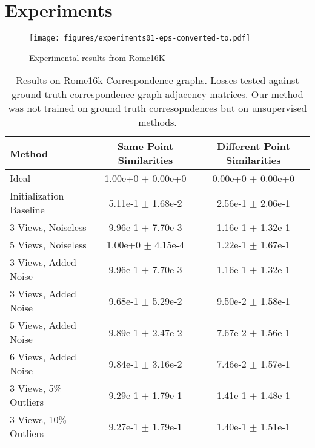 \documentclass[10pt,twocolumn,letterpaper]{article}
\begin{document}
\section{Experiments}

\begin{figure*}
\begin{center}
  \texttt{[image: figures/experiments01-eps-converted-to.pdf]}
  \end{center}
     \caption{Experimental results from Rome16K}
  \label{fig:short}
\end{figure*}

\begin{table*}
\begin{center}
\begin{tabular}{|l|c|c|}
\hline
Method & Same Point Similarities & Different Point Similarities  \\
\hline\hline\hline
Ideal                              & 1.00e+0 $\pm$ 0.00e+0 & 0.00e+0 $\pm$ 0.00e+0 \\ \hline
Initialization Baseline            & 5.11e-1 $\pm$ 1.68e-2 & 2.56e-1 $\pm$ 2.06e-1 \\ \hline
3 Views, Noiseless                 & 9.96e-1 $\pm$ 7.70e-3 & 1.16e-1 $\pm$ 1.32e-1 \\ \hline
5 Views, Noiseless                 & 1.00e+0 $\pm$ 4.15e-4 & 1.22e-1 $\pm$ 1.67e-1 \\ \hline
3 Views, Added Noise               & 9.96e-1 $\pm$ 7.70e-3 & 1.16e-1 $\pm$ 1.32e-1 \\ \hline
3 Views, Added Noise               & 9.68e-1 $\pm$ 5.29e-2 & 9.50e-2 $\pm$ 1.58e-1 \\ \hline
5 Views, Added Noise               & 9.89e-1 $\pm$ 2.47e-2 & 7.67e-2 $\pm$ 1.56e-1 \\ \hline
6 Views, Added Noise               & 9.84e-1 $\pm$ 3.16e-2 & 7.46e-2 $\pm$ 1.57e-1 \\ \hline
3 Views, 5\% Outliers              & 9.29e-1 $\pm$ 1.79e-1 & 1.41e-1 $\pm$ 1.48e-1 \\ \hline
3 Views, 10\% Outliers             & 9.27e-1 $\pm$ 1.79e-1 & 1.40e-1 $\pm$ 1.51e-1 \\ \hline

\hline
\end{tabular}
\end{center}
\caption{
Results on Rome16k Correspondence graphs.
Losses tested against ground truth correspondence graph adjacency matrices.
Our method was not trained on ground truth corresopndences but on unsupervised methods.
}
\end{table*}
\end{document}
